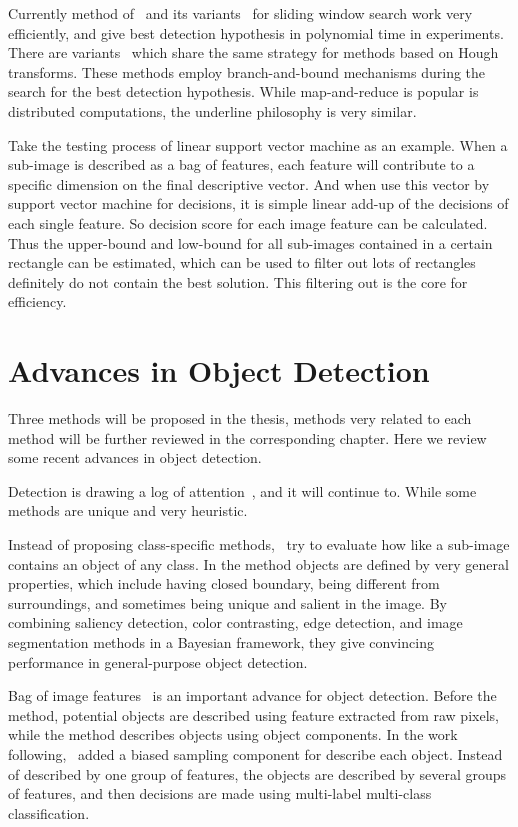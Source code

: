 Currently method of~\cite{ij15} and its variants~\cite{drl1} for sliding window search work very efficiently, and give best detection hypothesis in polynomial time in experiments. There are variants~\cite{ac27} which share the same strategy for methods based on Hough transforms. These methods employ branch-and-bound mechanisms during the search for the best detection hypothesis. While map-and-reduce is popular is distributed computations, the underline philosophy is very similar.

Take the testing process of linear support vector machine as an example. When a sub-image is described as a bag of features, each feature will contribute to a specific dimension on the final descriptive vector.
And when use this vector by support vector machine for decisions, it is simple linear add-up of the decisions of each single feature. So decision score for each image feature can be calculated. Thus the upper-bound and low-bound for all sub-images contained in a certain rectangle can be estimated, which can be used to filter out lots of rectangles definitely do not contain the best solution. This filtering out is the core for efficiency.

\section{Advances in Object Detection}

Three methods will be proposed in the thesis, methods very related to each method will be further reviewed in the corresponding chapter. Here we review some recent advances in object detection.

Detection is drawing a log of attention~\cite{ij4,ac31,ac30,ac4,ac32,ac29,ac28,ac1,ac9,ac2,ac3,ac22,lb1,ac5,ac10,ac21,ac18}, and it will continue to. While some methods are unique and very heuristic.

Instead of proposing class-specific methods,~\cite{wiao} try to evaluate how like a sub-image contains an object of any class. In the method objects are defined by very general properties, which include having closed boundary, being different from surroundings, and sometimes being unique and salient in the image. By combining saliency detection, color contrasting, edge detection, and image segmentation methods in a Bayesian framework, they give convincing performance in general-purpose object detection.

Bag of image features~\cite{bgf} is an important advance for object detection. Before the method, potential objects are described using feature extracted from raw pixels, while the method describes objects using object components. In the work following,~\cite{ij13} added a biased sampling component for describe each object. Instead of described by one group of features, the objects are described by several groups of features, and then decisions are made using multi-label multi-class classification.

